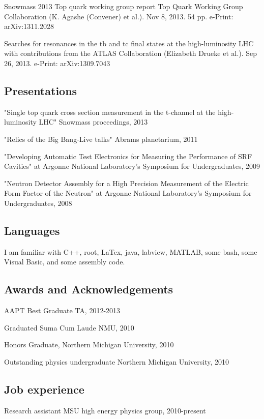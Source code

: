 \documentclass{article}
\begin{document}
Snowmass 2013 Top quark working group report
Top Quark Working Group Collaboration (K. Agashe (Convener) et al.). Nov 8, 2013. 54 pp.
e-Print: arXiv:1311.2028 

Searches for resonances in the tb and tc final states at the high-luminosity LHC
with contributions from the ATLAS Collaboration (Elizabeth Drueke et al.). Sep 26, 2013.
e-Print: arXiv:1309.7043


\subsection{Presentations}
\hspace{0.5cm}"Single top quark cross section measurement in the t-channel at the high-luminosity LHC" Snowmass proceedings, 2013

"Relics of the Big Bang-Live talks" Abrams planetarium, 2011

"Developing Automatic Test Electronics for Measuring the Performance of SRF Cavities" at Argonne National Laboratory’s Symposium for Undergraduates, 2009

"Neutron Detector Assembly for a High Precision Measurement of the Electric Form Factor of the Neutron" at Argonne National Laboratory’s Symposium for Undergraduates, 2008


\subsection{Languages}
\hspace{0.5cm}I am familiar with C++, root, LaTex, java, labview, MATLAB, some bash, some Visual Basic, and some assembly code. 


\subsection{Awards and Acknowledgements}
\hspace{0.5cm}AAPT Best Graduate TA, 2012-2013

Graduated Suma Cum Laude NMU, 2010

Honors Graduate, Northern Michigan University, 2010

Outstanding physics undergraduate Northern Michigan University, 2010


\subsection{Job experience}
\hspace{0.5cm}Research assistant MSU high energy physics group, 2010-present
\end{document}

